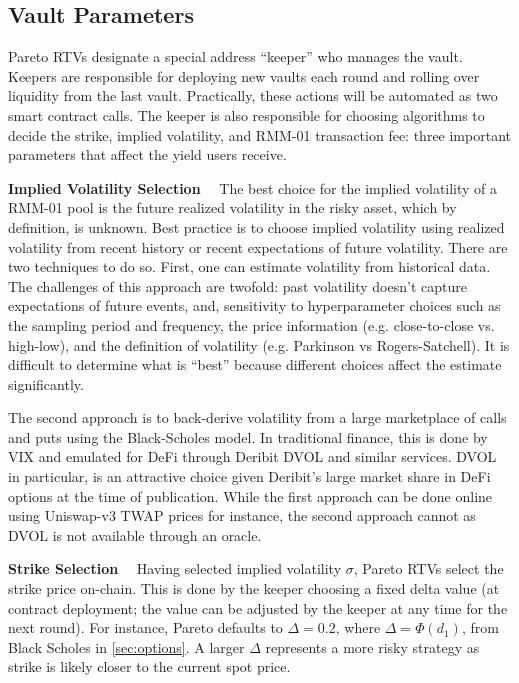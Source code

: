 \documentclass[hidelinks, 12pt]{article}
\begin{document}
\subsection{Vault Parameters}
\label{sec:management}

Pareto RTVs designate a special address ``keeper'' who manages the vault. Keepers are responsible for deploying new vaults each round and rolling over liquidity from the last vault. Practically, these actions will be automated as two smart contract calls.
The keeper is also responsible for choosing algorithms to decide the strike, implied volatility, and RMM-01 transaction fee: three important parameters that affect the yield users receive. 

\textbf{Implied Volatility Selection}$\quad$ The best choice for the implied volatility of a RMM-01 pool is the future realized volatility in the risky asset, which by definition, is unknown. 
Best practice is to choose implied volatility using realized volatility from recent history or recent expectations of future volatility.
There are two techniques to do so. First, one can estimate volatility from historical data. The challenges of this approach are twofold: past volatility doesn't capture expectations of future events, and, sensitivity to hyperparameter choices such as the sampling period and frequency, the price information (e.g. close-to-close vs. high-low), and the definition of volatility (e.g. Parkinson vs Rogers-Satchell). 
It is difficult to determine what is ``best'' because different choices affect the estimate significantly. 

The second approach is to back-derive volatility from a large marketplace of calls and puts using the Black-Scholes model. 
In traditional finance, this is done by VIX and emulated for DeFi through Deribit DVOL and similar services.
DVOL in particular, is an attractive choice given Deribit's large market share in DeFi options at the time of publication.
While the first approach can be done online using Uniswap-v3 TWAP prices for instance, the second approach cannot as DVOL is not available through an oracle. 

\textbf{Strike Selection}$\quad$ Having selected implied volatility $\sigma$, Pareto RTVs select the strike price on-chain. 
This is done by the keeper choosing a fixed delta value (at contract deployment; the value can be adjusted by the keeper at any time for the next round). For instance, Pareto defaults to $\Delta = 0.2$, where $\Delta = \Phi(d_1)$, from Black Scholes in \ref{sec:options}.
A larger $\Delta$ represents a more risky strategy as strike is likely closer to the current spot price. 
\end{document}
